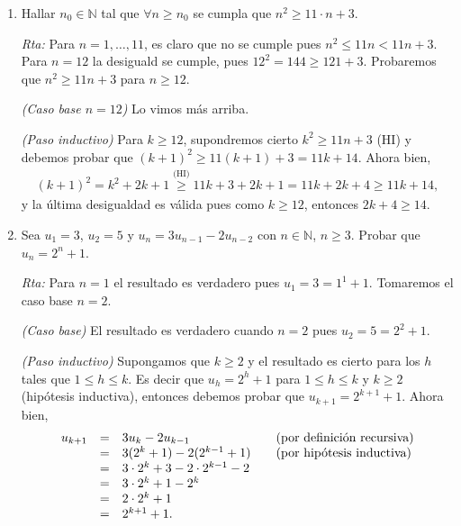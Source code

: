\documentclass[12pt,spanish,makeidx]{amsbook}
\newcommand{\rta}{\noindent\textit{Rta: }}
\begin{document}
\begin{enumerate}
		\medskip
		
		
		
		
		\item Hallar $n_0 \in {\mathbb N}$ tal que $\forall n \ge n_0$ se cumpla que $n^2 \ge 11 \cdot n + 3$.
		
		\rta Para $n=1,\ldots,11$,  es claro que no se cumple pues $n^2 \le 11n < 11n +3$. Para $n =12$ la desiguald se cumple, pues $12^2 = 144 \ge 121+3$.   Probaremos  que $n^2 \ge 11  n + 3$ para $n\ge 12$. 
		
			\textit{(Caso base $n=12$) } Lo vimos más arriba.
			
			\textit{(Paso inductivo) }  Para  $k \ge 12$,  supondremos cierto $k^2 \ge 11  n + 3$ (HI) y debemos probar que $(k+1)^2 \ge 11  (k+1) + 3 =11k +14$. Ahora bien, 
			\begin{align*}
				(k+1)^2 = k^2+2k+1 \overset{\text{(HI)}}{\ge} 11k+3 +2k+1 = 11k + 2k+ 4 \ge 11k +14, 
			\end{align*}
			y la última desigualdad es válida pues como  $k\ge 12$,  entonces $2k+ 4 \ge 14$.
		
				\medskip
		
		
		\item Sea $u_1=3$, $u_2=5$ y $u_n=3 u_{n-1} - 2 u_{n-2}$ con $n\in \mathbb N$, $n\geq 3$.
		Probar que $u_n=2^n+1$.
		
		\rta Para $n=1$ el resultado es verdadero pues $u_1 =3 = 1^1 +1$. Tomaremos el caso  base $n=2$.
		
		\textit{(Caso  base) } El resultado es verdadero cuando  $n=2$ pues $u_2 = 5 =2^2+1$.
		
		{\it (Paso  inductivo)} Supongamos que $k \ge 2$ y el resultado  es cierto para los $h$ tales que  $1 \le h \le k$. Es decir que $u_h = 2^h+1$ para $1 \le h \le k$ y $k \ge 2$ (hipótesis inductiva),  entonces debemos probar que $u_{k+1} = 2^{k+1}+1$. Ahora bien, 
		$$
		\begin{matrix} u_{k+1} &=& 3u_k -2u_{k-1} \hfill &\quad \text{(por definición recursiva)} \hfill \\
		&=& 3(2^k+1)-2(2^{k-1}+1) \hfill &\quad \text{(por hipótesis inductiva})\hfill \\
		&=& 3\cdot 2^k+3-2\cdot 2^{k-1}-2 \hfill & \\
		&=& 3\cdot 2^k+1- 2^{k} \hfill & \\
		&=& 2\cdot 2^k+1 \hfill & \\
		&=& 2^{k+1}+1. \hfill & 
		\end{matrix}
		$$
		

\end{enumerate}
\end{document}
